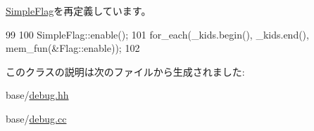\hyperlink{classDebug_1_1SimpleFlag_a486f22824bd83c5308a0d70ffac6f758}{SimpleFlag}を再定義しています。


\begin{DoxyCode}
99 {
100     SimpleFlag::enable();
101     for_each(_kids.begin(), _kids.end(), mem_fun(&Flag::enable));
102 }
\end{DoxyCode}


このクラスの説明は次のファイルから生成されました:\begin{DoxyCompactItemize}
\item 
base/\hyperlink{base_2debug_8hh}{debug.hh}\item 
base/\hyperlink{base_2debug_8cc}{debug.cc}\end{DoxyCompactItemize}
